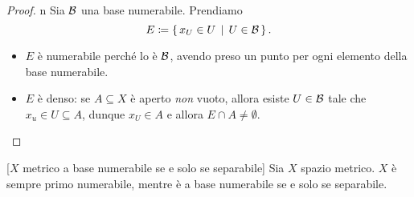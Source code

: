 \begin{proof}{n}
	Sia $\mathcal{B}$ una base numerabile. Prendiamo
	\begin{equation*}
		E\coloneqq\Set{x_U\in U| U\in \basis}.
	\end{equation*}
\begin{itemize}
	\item $E$ è numerabile perché lo è $\mathcal{B}$, avendo preso un punto per ogni elemento della base numerabile.
	\item $E$ è denso: se $A\subseteq X$ è aperto \textit{non} vuoto, allora esiste $U\in\mathcal{B}$ tale che $x_u\in U\subseteq A$, dunque $x_U\in A$ e allora $E\cap A\neq \emptyset$.\qedhere
\end{itemize}
\end{proof}
\begin{proposition}{}[$X$ metrico a base numerabile se e solo se separabile]
	Sia $X$ spazio metrico. $X$ è sempre primo numerabile, mentre è a base numerabile se e solo se separabile.
\end{proposition}
